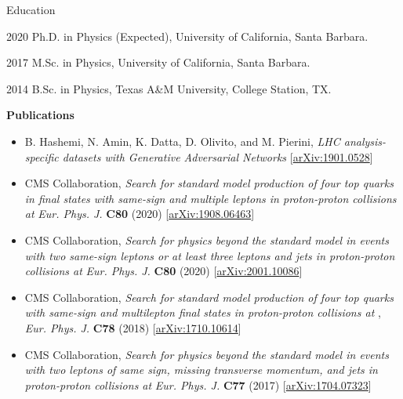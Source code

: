 \begin{vitae}

\begin{vitaesection}{Education}
\vspace{-0.1cm}
\item [2020] Ph.D. in Physics (Expected), University of California, Santa Barbara.
\item [2017] M.Sc. in Physics, University of California, Santa Barbara.
\item [2014] B.Sc. in Physics, Texas A\&M University, College Station, TX.
\end{vitaesection}

\textbf{Publications}

    \begin{itemize}
        \item B. Hashemi, N. Amin, K. Datta, D. Olivito, and M. Pierini, \textit{LHC analysis-specific datasets with Generative Adversarial Networks} [\href{https://arxiv.org/abs/1901.05282}{arXiv:1901.0528}]

        \item CMS Collaboration, \textit{Search for standard model production of four top quarks in final states with same-sign and multiple leptons in proton-proton collisions at \sthirteen} 
            \textit{Eur. Phys. J.} \textbf{C80} (2020) 
            [\href{https://arxiv.org/abs/1908.06463}{arXiv:1908.06463}]
        \item CMS Collaboration, \textit{Search for physics beyond the standard model in events with two same-sign leptons or at least three leptons and jets in proton-proton collisions at \sthirteen} 
            \textit{Eur. Phys. J.} \textbf{C80} (2020) 
            [\href{https://arxiv.org/abs/2001.10086}{arXiv:2001.10086}]
        \item CMS Collaboration, \textit{Search for standard model production of four top quarks with same-sign and multilepton final states in proton-proton collisions at \sthirteen},
            \textit{Eur. Phys. J.} \textbf{C78} (2018) 
            [\href{https://arxiv.org/abs/1710.10614}{arXiv:1710.10614}]
        \item CMS Collaboration, \textit{Search for physics beyond the standard model in events with two leptons of same sign, missing transverse momentum, and jets in proton-proton collisions at \sthirteen}
            \textit{Eur. Phys. J.} \textbf{C77} (2017) 
            [\href{https://arxiv.org/abs/1704.07323}{arXiv:1704.07323}]
    \end{itemize}

\end{vitae}
